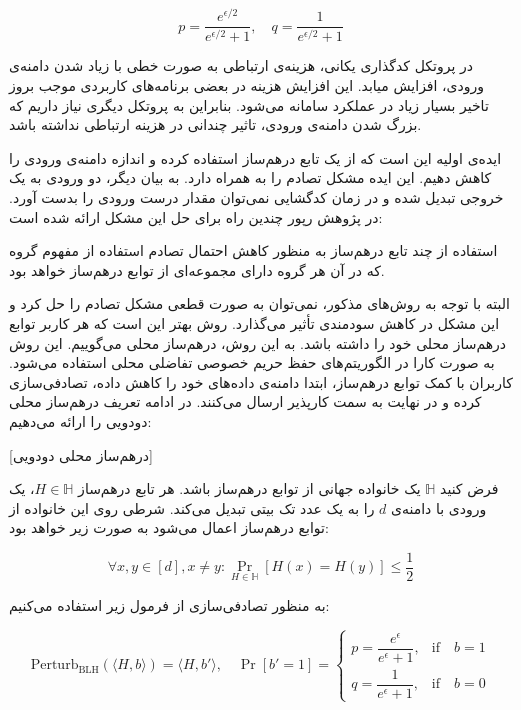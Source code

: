 $$p = \frac{e^{\epsilon/2}}{e^{\epsilon/2} + 1}, \quad q = \frac{1}{e^{\epsilon/2} + 1}$$


در پروتکل کدگذاری یکانی، هزینه‌ی ارتباطی به صورت خطی با زیاد شدن دامنه‌ی ورودی، افزایش میابد. این افزایش هزینه در بعضی برنامه‌های کاربردی موجب بروز تاخیر بسیار زیاد در عملکرد سامانه می‌شود. بنابراین به پروتکل دیگری نیاز داریم که بزرگ شدن دامنه‌ی ورودی، تاثیر چندانی در هزینه ارتباطی نداشته باشد.

ایده‌ی اولیه این است که از یک تابع درهم‌ساز استفاده کرده و اندازه‌ دامنه‌ی ورودی را کاهش دهیم. این ایده مشکل تصادم را به همراه دارد. به بیان دیگر، دو ورودی به یک خروجی تبدیل شده و در زمان کدگشایی نمی‌توان مقدار درست ورودی را بدست آورد. در پژوهش رپور  چندین راه برای حل این مشکل ارائه شده است:

 استفاده از چند تابع درهم‌ساز به منظور کاهش احتمال تصادم
 استفاده از مفهوم گروه که در آن هر گروه دارای مجموعه‌ای از توابع درهم‌ساز خواهد بود.

البته با توجه به روش‌های مذکور، نمی‌توان به صورت قطعی مشکل تصادم را حل کرد و این مشکل در کاهش سودمندی تأثیر می‌گذارد. روش بهتر این است که هر کاربر توابع درهم‌ساز محلی خود را داشته باشد. به این روش، درهم‌ساز محلی می‌گوییم. این روش به صورت کارا در الگوریتم‌های حفظ حریم خصوصی تفاضلی محلی استفاده می‌شود. کاربران با کمک توابع درهم‌ساز، ابتدا دامنه‌ی داده‌های خود را کاهش داده، تصادفی‌سازی کرده و در نهایت به سمت کارپذیر ارسال می‌کنند. در ادامه تعریف درهم‌ساز محلی دودویی را ارائه می‌دهیم:

[درهم‌ساز محلی دودویی]

فرض کنید $\mathbb{H}$ یک خانواده جهانی از توابع درهم‌ساز باشد. هر تابع درهم‌ساز $H \in \mathbb{H}$، یک ورودی با دامنه‌ی $d$ را به یک عدد تک بیتی تبدیل می‌کند. شرطی روی این خانواده از توابع درهم‌ساز اعمال می‌شود به صورت زیر خواهد بود:

\begin{equation}
\forall x, y \in [d], x \neq y : \Pr_{H \in \mathbb{H}} [H(x) = H(y)] \leq \frac{1}{2}
\end{equation}


به منظور تصادفی‌سازی از فرمول زیر استفاده می‌کنیم:

$$\text{Perturb}_{\text{BLH}}(\langle H, b \rangle) = \langle H, b' \rangle, \quad \Pr[b' = 1] = 
\begin{cases} 
p = \dfrac{e^\epsilon}{e^{\epsilon}+1}, & \text{if} \quad b = 1 \\ 
q = \dfrac{1}{e^{\epsilon}+1}, & \text{if} \quad b = 0 
\end{cases}$$

